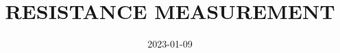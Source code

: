 \documentclass[a4paper]{article}
\title{RESISTANCE MEASUREMENT}
\date{2023-01-09}
\begin{document}

\maketitle
\tableofcontents
\pagebreak





\end{document}
